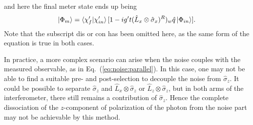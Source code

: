 \documentclass[aps,pra,showpacs,twoside,twocolumn,10pt]{revtex4-1}
\begin{document}
and here the final meter state ends up being
\begin{equation}
    \ket{\Phi_m}=\braket{\chi_f^{\prime}|\chi_{in}^{\prime}}[1-ig^{\prime}t(\hat{L}_x\otimes\hat{\sigma}_x)^R)_w \hat{q}\ket{\Phi_{in}}].
\end{equation}
Note that the subscript dis or con has been omitted here, as the same form of the equation is true in both cases.
\par



In practice, a more complex scenario can arise when the noise couples with the measured observable, as in Eq.~(\ref{eq:noise:parallel}). In this case, one may not be able to find a suitable pre- and post-selection to decouple the noise from $\hat{\sigma}_z$. It could be possible to separate $\hat{\sigma}_z$ and $\hat{L}_x \otimes \hat{\sigma}_z$ or $\hat{L}_z \otimes \hat{\sigma}_z$, but in both arms of the interferometer, there still remains a contribution of $\hat{\sigma}_z$. Hence the complete dissociation of the $z$-component of polarization of the photon 
from the noise part may not be achievable by this method.
\end{document}

